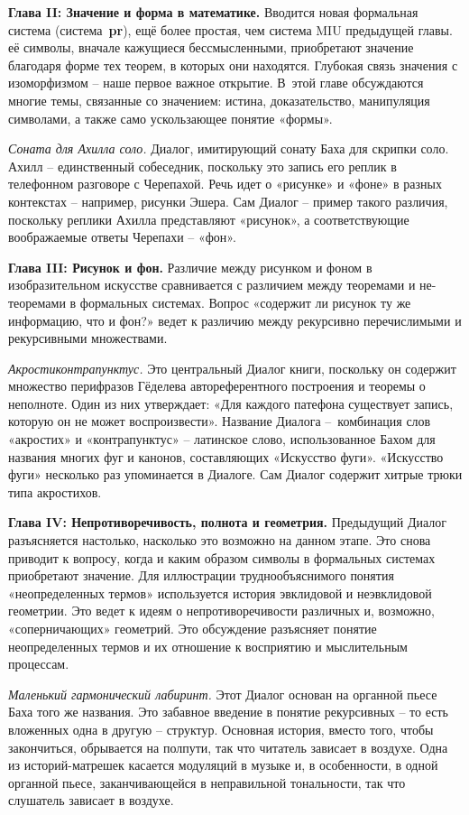 \documentclass[../main.tex]{subfiles}
\begin{document}
\textbf{Глава II: Значение и форма в математике.}
Вводится новая формальная система (система~\textbf{pr}), ещё более простая, чем система MIU предыдущей главы. её символы, вначале кажущиеся бессмысленными, приобретают значение благодаря форме тех теорем, в которых они находятся. Глубокая связь значения с изоморфизмом \--- наше первое важное открытие. В~этой главе обсуждаются многие темы, связанные со значением: истина, доказательство, манипуляция символами, а также само ускользающее понятие «формы».

\emph{Соната для Ахилла соло.}
Диалог, имитирующий сонату Баха для скрипки соло. Ахилл \--- единственный собеседник, поскольку это запись его реплик в телефонном разговоре с Черепахой. Речь идет о «рисунке» и «фоне» в разных контекстах \--- например, рисунки Эшера. Сам Диалог \--- пример такого различия, поскольку реплики Ахилла представляют «рисунок», а соответствующие воображаемые ответы Черепахи \--- «фон».

\textbf{Глава III: Рисунок и фон.}
Различие между рисунком и фоном в изобразительном искусстве сравнивается с различием между теоремами и не-теоремами в формальных системах. Вопрос «содержит ли рисунок ту же информацию, что и фон?» ведет к различию между рекурсивно перечислимыми и рекурсивными множествами.

\emph{Акростиконтрапунктус.}
Это центральный Диалог книги, поскольку он содержит множество перифразов Гёделева автореферентного построения и теоремы о неполноте. Один из них утверждает: «Для каждого патефона существует запись, которую он не может воспроизвести». Название Диалога \---~комбинация слов «акростих» и «контрапунктус» \--- латинское слово, использованное Бахом для названия многих фуг и канонов, составляющих «Искусство фуги». «Искусство фуги» несколько раз упоминается в Диалоге. Сам Диалог содержит хитрые трюки типа акростихов.

\textbf{Глава IV: Непротиворечивость, полнота и геометрия.}
Предыдущий Диалог разъясняется настолько, насколько это возможно на данном этапе. Это снова приводит к вопросу, когда и каким образом символы в формальных системах приобретают значение. Для иллюстрации труднообъяснимого понятия «неопределенных термов» используется история эвклидовой и неэвклидовой геометрии. Это ведет к идеям о непротиворечивости различных и, возможно, «соперничающих» геометрий. Это обсуждение разъясняет понятие неопределенных термов и их отношение к восприятию и мыслительным процессам.

\emph{Маленький гармонический лабиринт.}
Этот Диалог основан на органной пьесе Баха того же названия. Это забавное введение в понятие рекурсивных \--- то есть вложенных одна в другую \--- структур. Основная история, вместо того, чтобы закончиться, обрывается на полпути, так что читатель зависает в воздухе. Одна из историй-матрешек касается модуляций в музыке и, в особенности, в одной органной пьесе, заканчивающейся в неправильной тональности, так что слушатель зависает в воздухе.
\end{document}
